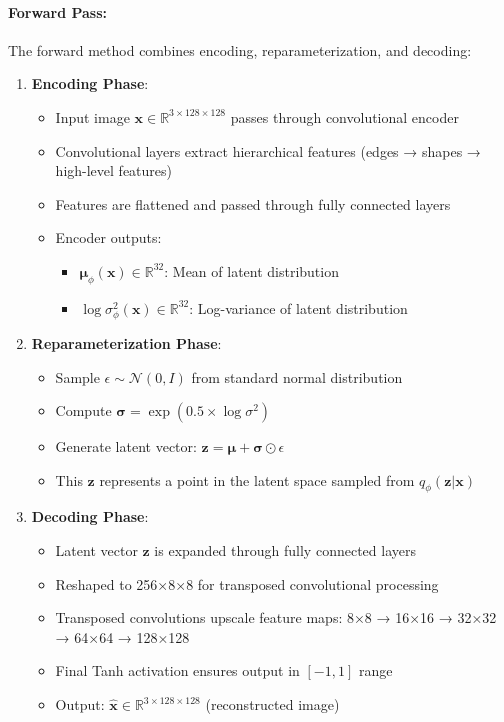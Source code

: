 \documentclass[conference]{IEEEtran}
\newcommand{\logvar}{\log \sigma^2}
\begin{document}
\paragraph{Forward Pass:}
The forward method combines encoding, reparameterization, and decoding:

\begin{enumerate}
    \item \textbf{Encoding Phase}:
    \begin{itemize}
        \item Input image $\mathbf{x} \in \mathbb{R}^{3 \times 128 \times 128}$ passes through convolutional encoder
        \item Convolutional layers extract hierarchical features (edges → shapes → high-level features)
        \item Features are flattened and passed through fully connected layers
        \item Encoder outputs:
        \begin{itemize}
            \item $\boldsymbol{\mu}_\phi(\mathbf{x}) \in \mathbb{R}^{32}$: Mean of latent distribution
            \item $\logvar_\phi(\mathbf{x}) \in \mathbb{R}^{32}$: Log-variance of latent distribution
        \end{itemize}
    \end{itemize}
    
    \item \textbf{Reparameterization Phase}:
    \begin{itemize}
        \item Sample $\epsilon \sim \mathcal{N}(0, I)$ from standard normal distribution
        \item Compute $\boldsymbol{\sigma} = \exp(0.5 \times \logvar)$
        \item Generate latent vector: $\mathbf{z} = \boldsymbol{\mu} + \boldsymbol{\sigma} \odot \epsilon$
        \item This $\mathbf{z}$ represents a point in the latent space sampled from $q_\phi(\mathbf{z}|\mathbf{x})$
    \end{itemize}
    
    \item \textbf{Decoding Phase}:
    \begin{itemize}
        \item Latent vector $\mathbf{z}$ is expanded through fully connected layers
        \item Reshaped to 256×8×8 for transposed convolutional processing
        \item Transposed convolutions upscale feature maps: 8×8 → 16×16 → 32×32 → 64×64 → 128×128
        \item Final Tanh activation ensures output in $[-1, 1]$ range
        \item Output: $\hat{\mathbf{x}} \in \mathbb{R}^{3 \times 128 \times 128}$ (reconstructed image)
    \end{itemize}
    

\end{enumerate}
\end{document}
